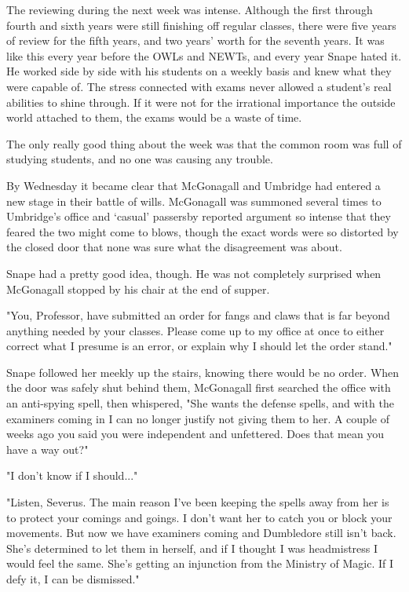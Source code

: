 \sbreak

The reviewing during the next week was intense. Although the first through fourth and sixth years were still finishing off regular classes, there were five years of review for the fifth years, and two years' worth for the seventh years. It was like this every year before the OWLs and NEWTs, and every year Snape hated it. He worked side by side with his students on a weekly basis and knew what they were capable of. The stress connected with exams never allowed a student's real abilities to shine through. If it were not for the irrational importance the outside world attached to them, the exams would be a waste of time.

The only really good thing about the week was that the common room was full of studying students, and no one was causing any trouble.

By Wednesday it became clear that McGonagall and Umbridge had entered a new stage in their battle of wills. McGonagall was summoned several times to Umbridge's office and `casual' passersby reported argument so intense that they feared the two might come to blows, though the exact words were so distorted by the closed door that none was sure what the disagreement was about.

Snape had a pretty good idea, though. He was not completely surprised when McGonagall stopped by his chair at the end of supper.

"You, Professor, have submitted an order for fangs and claws that is far beyond anything needed by your classes. Please come up to my office at once to either correct what I presume is an error, or explain why I should let the order stand."

Snape followed her meekly up the stairs, knowing there would be no order. When the door was safely shut behind them, McGonagall first searched the office with an anti-spying spell, then whispered, "She wants the defense spells, and with the examiners coming in I can no longer justify not giving them to her. A couple of weeks ago you said you were independent and unfettered. Does that mean you have a way out?"

"I don't know if I should..."

"Listen, Severus. The main reason I've been keeping the spells away from her is to protect your comings and goings. I don't want her to catch you or block your movements. But now we have examiners coming and Dumbledore still isn't back. She's determined to let them in herself, and if I thought I was headmistress I would feel the same. She's getting an injunction from the Ministry of Magic. If I defy it, I can be dismissed."

